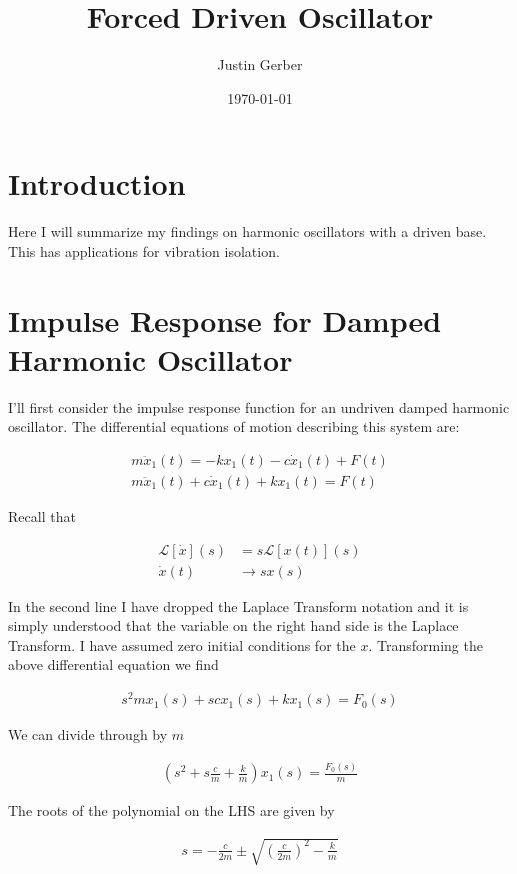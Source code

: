 \documentclass[12pt]{article}
\begin{document}
\title{Forced Driven Oscillator}
\author{Justin Gerber}
\date{\today}
\maketitle

\section{Introduction}
Here I will summarize my findings on harmonic oscillators with a driven base. This has applications for vibration isolation.

\section{Impulse Response for Damped Harmonic Oscillator}
I'll first consider the impulse response function for an undriven damped harmonic oscillator. The differential equations of motion describing this system are:

\begin{align}
m \ddot{x}_1(t) = -k x_1(t) -c \dot{x}_1(t) + F(t)\\
m\ddot{x}_1(t) + c \dot{x}_1(t) + k x_1(t) = F(t)
\end{align}

Recall that

\begin{align}
\mathcal{L}[\dot{x}](s) &= s \mathcal{L}[x(t)](s)\\
\dot{x}(t) &\rightarrow s x(s)
\end{align}

In the second line I have dropped the Laplace Transform notation and it is simply understood that the variable on the right hand side is the Laplace Transform. I have assumed zero initial conditions for the $x$. Transforming the above differential equation we find

\begin{align}
s^2 m x_1(s) + s c x_1(s) + k x_1(s) = F_0(s)
\end{align}

We can divide through by $m$

\begin{align}
\left(s^2 + s \frac{c}{m} + \frac{k}{m}\right)x_1(s) = \frac{F_0(s)}{m}
\end{align}

The roots of the polynomial on the LHS are given by

\begin{align}
s = -\frac{c}{2m} \pm \sqrt{\left(\frac{c}{2m}\right)^2 - \frac{k}{m}}
\end{align}
\end{document}

